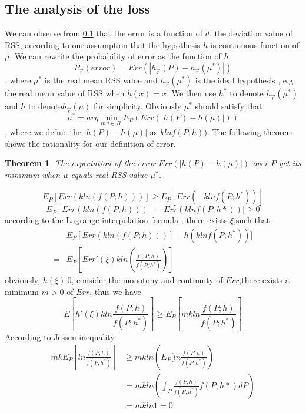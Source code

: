 \documentclass[10pt,conference,compsocconf,letterpaper]{IEEEtran}
\newtheorem{theorem}{Theorem}
\begin{document}
\subsection{The analysis of the loss}
We can observe from \ref{} that the error is a function of $d$, the deviation value of RSS, according to our assumption that the hypothesis $h$ is continuous function of $\mu$. We can rewrite the probability of error as the function of $h$ 
\begin{equation}
P_{\vec r}(error)=Err(|h_{\vec r}(P)-h_{\vec r}(\mu^*)|)
\end{equation}
, where $\mu^*$ is the real mean RSS value and $h_{\vec r}(\mu^*)$ is the ideal hypothesis , e.g. the real mean value of RSS when $h(x)=x$. We then use $h^*$ to denote $h_{\vec r}(\mu^*)$ and $h$ to denote$h_{\vec r}(\mu)$ for simplicity. Obviously $\mu^*$ should satisfy that 
\begin{equation}
\mu^*=arg\min_{mu\in R}E_P(Err(|h(P)-h(\mu)|))
\end{equation}
, where we defnie the $|h(P)-h(\mu)|$ as $klnf(P;h))$. The following theorem shows the rationality for our definition of error.
\begin{theorem}
The expectation of the error $Err(|h(P)-h(\mu)|)$ over $P$ get its minimum when $\mu$ equals real RSS value $\mu^*$. 
\end{theorem}
\begin{IEEEproof}
\[E_P[Err(kln(f(P;h)))]\geq E_P[Err(-klnf(P;h^*))] \]
\[E_P[Err(kln(f(P,h)))]-Err(klnf(P;h*))]\geq 0\]
according to the Lagrange interpolation formula , there exists $\xi$,such that
\begin{equation*}
\begin{aligned}
&E_P[Err(kln(f(P;h)))]-h(klnf(P;h^*))]\\
=&E_P[Err'(\xi)kln(\frac{f(P;h)}{f(P;h^*)})]
\end{aligned}
\end{equation*}
obviously, $h(\xi)\>0$, consider the monotony and continuity of $Err$,there exists a minimum $m>0$ of $Err$, thus we have
\[E[h'(\xi)kln\frac{f(P;h)}{f(P;h^*)}]\geq E_P[mkln\frac{f(P;h)}{f(P;h^*)}]\]
According to Jessen inequality
\begin{equation*}
\begin{aligned}
mkE_P[ln\frac{f(P;h)}{f(P;h^*)}]&\geq mkln(E_P[ln\frac{f(P;h)}{f(P;h^*)})\\
&=mkln(\int_P\frac{f(P;h)}{f(P;h^*)}f(P;h*)dP)\\
&=mkln1=0\\
\end{aligned}
\end{equation*}
\end{IEEEproof}
\end{document}
